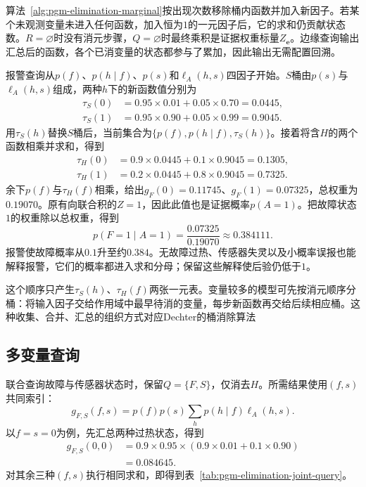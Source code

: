 算法~\ref{alg:pgm-elimination-marginal}按出现次数移除桶内函数并加入新因子。若某个未观测变量未进入任何函数，加入恒为$1$的一元因子后，它的求和仍贡献状态数。$R=\varnothing$时没有消元步骤，$Q=\varnothing$时最终乘积是证据权重标量$Z_{\bm{e}}$。边缘查询输出汇总后的函数，各个已消变量的状态都参与了累加，因此输出无需配置回溯。

报警查询从$p(f)$、$p(h\mid f)$、$p(s)$和$\ell_A(h,s)$四因子开始。$S$桶由$p(s)$与$\ell_A(h,s)$组成，两种$h$下的新函数值分别为
\begin{equation}
  \begin{aligned}
    \tau_S(0)&=0.95\times0.01+0.05\times0.70=0.0445,\\
    \tau_S(1)&=0.95\times0.90+0.05\times0.99=0.9045.
  \end{aligned}
  \label{eq:pgm-elimination-alarm-s}
\end{equation}
用$\tau_S(h)$替换$S$桶后，当前集合为$\{p(f),p(h\mid f),\tau_S(h)\}$。接着将含$H$的两个函数相乘并求和，得到
\begin{equation}
  \begin{aligned}
    \tau_H(0)&=0.9\times0.0445+0.1\times0.9045=0.1305,\\
    \tau_H(1)&=0.2\times0.0445+0.8\times0.9045=0.7325.
  \end{aligned}
  \label{eq:pgm-elimination-alarm-h}
\end{equation}
余下$p(f)$与$\tau_H(f)$相乘，给出$g_F(0)=0.11745$、$g_F(1)=0.07325$，总权重为$0.19070$。原有向联合积的$Z=1$，因此此值也是证据概率$p(A=1)$。把故障状态$1$的权重除以总权重，得到
\begin{equation}
  p(F=1\mid A=1)
  =\frac{0.07325}{0.19070}
  \approx0.384111.
  \label{eq:pgm-elimination-alarm-posterior}
\end{equation}
报警使故障概率从$0.1$升至约$0.384$。无故障过热、传感器失灵以及小概率误报也能解释报警，它们的概率都进入求和分母；保留这些解释使后验仍低于$1$。

这个顺序只产生$\tau_S(h)$、$\tau_H(f)$两张一元表。变量较多的模型可先按消元顺序分桶：将输入因子交给作用域中最早待消的变量，每步新函数再交给后续相应桶。这种收集、合并、汇总的组织方式对应Dechter的桶消除算法

\subsection{多变量查询}
\label{sec:pgm-elimination-multivariate-query}

联合查询故障与传感器状态时，保留$Q=\{F,S\}$，仅消去$H$。所需结果使用$(f,s)$共同索引：
\begin{equation}
  g_{F,S}(f,s)
  =p(f)p(s)\sum_h p(h\mid f)\ell_A(h,s).
  \label{eq:pgm-elimination-joint-query}
\end{equation}
以$f=s=0$为例，先汇总两种过热状态，得到
\[
  \begin{aligned}
    g_{F,S}(0,0)
    &=0.9\times0.95\times(0.9\times0.01+0.1\times0.90)\\
    &=0.084645.
  \end{aligned}
\]
对其余三种$(f,s)$执行相同求和，即得到表~\ref{tab:pgm-elimination-joint-query}。


